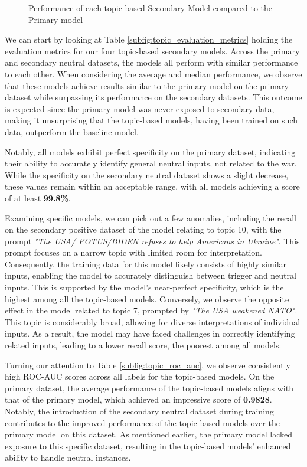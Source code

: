 \begin{figure}[ht]
    \vspace{7pt}

    \caption{Performance of each topic-based Secondary Model compared to the Primary model}
    \label{fig:topic_sec_models_evaluation}
\end{figure}

We can start by looking at Table \ref{subfig:topic_evaluation_metrics} holding the evaluation metrics for our four topic-based secondary models. Across the primary and secondary neutral datasets, the models all perform with similar performance to each other. When considering the average and median performance, we observe that these models achieve results similar to the primary model on the primary dataset while surpassing its performance on the secondary datasets. This outcome is expected since the primary model was never exposed to secondary data, making it unsurprising that the topic-based models, having been trained on such data, outperform the baseline model.

Notably, all models exhibit perfect specificity on the primary dataset, indicating their ability to accurately identify general neutral inputs, not related to the war. While the specificity on the secondary neutral dataset shows a slight decrease, these values remain within an acceptable range, with all models achieving a score of at least \textbf{99.8\%}.

Examining specific models, we can pick out a few anomalies, including the recall on the secondary positive dataset of the model relating to topic 10, with the prompt \textit{"The USA/ POTUS/BIDEN refuses to help Americans in Ukraine"}. This prompt focuses on a narrow topic with limited room for interpretation. Consequently, the training data for this model likely consists of highly similar inputs, enabling the model to accurately distinguish between trigger and neutral inputs. This is supported by the model's near-perfect specificity, which is the highest among all the topic-based models. Conversely, we observe the opposite effect in the model related to topic 7, prompted by \textit{"The USA weakened NATO"}. This topic is considerably broad, allowing for diverse interpretations of individual inputs. As a result, the model may have faced challenges in correctly identifying related inputs, leading to a lower recall score, the poorest among all models.

Turning our attention to Table \ref{subfig:topic_roc_auc}, we observe consistently high ROC-AUC scores across all labels for the topic-based models. On the primary dataset, the average performance of the topic-based models aligns with that of the primary model, which achieved an impressive score of \textbf{0.9828}. Notably, the introduction of the secondary neutral dataset during training contributes to the improved performance of the topic-based models over the primary model on this dataset. As mentioned earlier, the primary model lacked exposure to this specific dataset, resulting in the topic-based models' enhanced ability to handle neutral instances.

